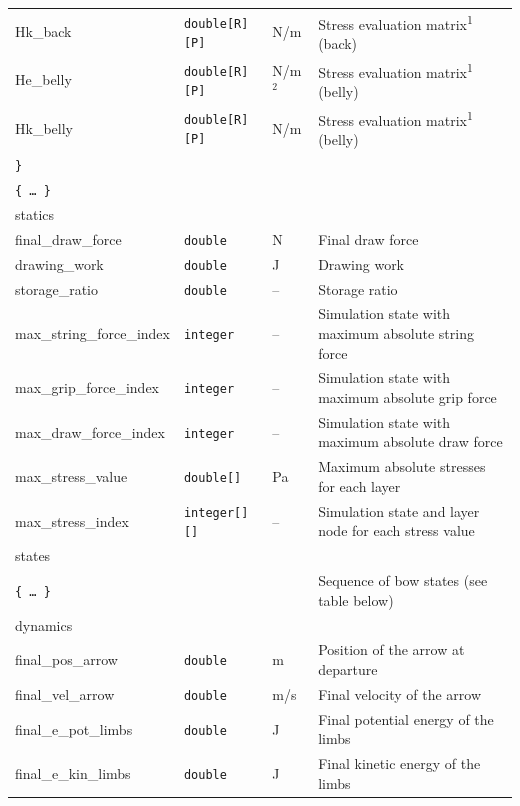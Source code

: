 \documentclass[12pt]{article}
\begin{document}
\begin{table}[H]
{\begin{tabular}{ l | l | l | l }
\quad\quad\quad\quad Hk\_back & \texttt{double[R][P]} & \unit[]{N/m} & Stress evaluation matrix\textsuperscript{1} (back) \\
\quad\quad\quad\quad He\_belly & \texttt{double[R][P]} & \unit[]{N/m$^2$} & Stress evaluation matrix\textsuperscript{1} (belly) \\
\quad\quad\quad\quad Hk\_belly & \texttt{double[R][P]} & \unit[]{N/m} & Stress evaluation matrix\textsuperscript{1} (belly) \\
\quad\quad\quad \texttt{\}} & & & \\
\quad\quad\quad \texttt{\{\ \ldots\ \}} & & & \\
\tablespace statics & & & \\
\quad final\_draw\_force & \texttt{double} & \unit[]{N} & Final draw force \\
\quad drawing\_work & \texttt{double} & \unit[]{J} & Drawing work \\
\quad storage\_ratio & \texttt{double} & -- & Storage ratio \\
\quad max\_string\_force\_index & \texttt{integer} & -- & Simulation state with maximum absolute string force \\
\quad max\_grip\_force\_index & \texttt{integer} & -- & Simulation state with maximum absolute grip force \\
\quad max\_draw\_force\_index  & \texttt{integer} & -- & Simulation state with maximum absolute draw force \\
\quad max\_stress\_value & \texttt{double[]} & \unit[]{Pa} & Maximum absolute stresses for each layer \\
\quad max\_stress\_index & \texttt{integer[][]} & -- & Simulation state and layer node for each stress value \\
\quad states & & & \\
\quad\quad \texttt{\{\ \ldots\ \}} & & & Sequence of bow states (see table below) \\
\tablespace dynamics & & & \\
\quad final\_pos\_arrow & \texttt{double} & \unit[]{m} & Position of the arrow at departure\\
\quad final\_vel\_arrow & \texttt{double} & \unit[]{m/s} & Final velocity of the arrow \\
\quad final\_e\_pot\_limbs & \texttt{double} & \unit[]{J} & Final potential energy of the limbs \\
\quad final\_e\_kin\_limbs & \texttt{double} & \unit[]{J} & Final kinetic energy of the limbs \\

\end{tabular}}
\end{table}
\end{document}
